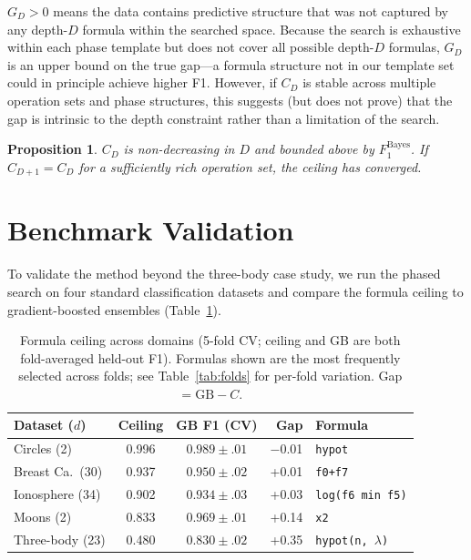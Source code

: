 \documentclass[journal]{IEEEtran}
\newtheorem{proposition}{Proposition}
\begin{document}
$G_D > 0$ means the data contains predictive structure that was not
captured by any depth-$D$ formula within the searched space. Because
the search is exhaustive within each phase template but does not
cover all possible depth-$D$ formulas, $G_D$ is an upper bound on
the true gap---a formula structure not in our template set could in
principle achieve higher F1. However, if $C_D$ is stable across
multiple operation sets and phase structures, this suggests (but
does not prove) that the gap is intrinsic to the depth constraint
rather than a limitation of the search.

\begin{proposition}
$C_D$ is non-decreasing in $D$ and bounded above by
$F_1^{\mathrm{Bayes}}$. If $C_{D+1} = C_D$ for a sufficiently
rich operation set, the ceiling has converged.
\end{proposition}

\section{Benchmark Validation}

To validate the method beyond the three-body case study, we run the
phased search on four standard classification datasets and compare
the formula ceiling to gradient-boosted ensembles (Table~\ref{tab:bench}).

\begin{table}[h]
\caption{Formula ceiling across domains (5-fold CV; ceiling and GB
are both fold-averaged held-out F1). Formulas shown are the most
frequently selected across folds; see Table~\ref{tab:folds} for
per-fold variation. Gap $= \text{GB} - C$.}
\label{tab:bench}
\scriptsize
\begin{tabular}{@{}lccrl@{}}
\toprule
Dataset ($d$) & Ceiling & GB F1 (CV) & Gap & Formula \\
\midrule
Circles (2) & 0.996 & $0.989{\pm}.01$ & $-$0.01 & \texttt{hypot} \\
Breast Ca.\ (30) & 0.937 & $0.950{\pm}.02$ & +0.01 & \texttt{f0+f7} \\
Ionosphere (34) & 0.902 & $0.934{\pm}.03$ & +0.03 & \texttt{log(f6 min f5)} \\
Moons (2) & 0.833 & $0.969{\pm}.01$ & +0.14 & \texttt{x2} \\
Three-body (23) & 0.480 & $0.830{\pm}.02$ & +0.35 & \texttt{hypot(n,\,$\lambda$)} \\
\bottomrule
\end{tabular}
\end{table}
\end{document}
